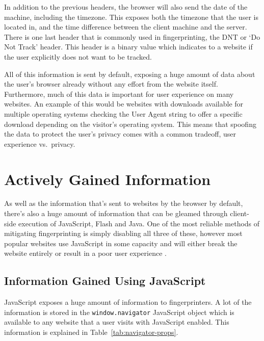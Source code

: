 In addition to the previous headers, the browser will also send the date of the machine, including the timezone.
This exposes both the timezone that the user is located in, and the time difference between the client machine and the server.
There is one last header that is commonly used in fingerprinting, the DNT or `Do Not Track' header.
This header is a binary value which indicates to a website if the user explicitly does not want to be tracked.

All of this information is sent by default, exposing a huge amount of data about the user's browser already without any effort from the website itself.
Furthermore, much of this data is important for user experience on many websites.
An example of this would be websites with downloads available for multiple operating systems checking the User Agent string to offer a specific download depending on the visitor's operating system.
This means that spoofing the data to protect the user's privacy comes with a common tradeoff, user experience vs.\ privacy.

\section{Actively Gained Information}

As well as the information that's sent to websites by the browser by default, there's also a huge amount of information that can be gleamed through client-side execution of JavaScript, Flash and Java.
One of the most reliable methods of mitigating fingerprinting is simply disabling all three of these, however most popular websites use JavaScript in some capacity and will either break the website entirely or result in a poor user experience \citep{disable-js}.

\subsection{Information Gained Using JavaScript}

JavaScript exposes a huge amount of information to fingerprinters.
A lot of the information is stored in the \texttt{window.navigator} JavaScript object which is available to any website that a user visits with JavaScript enabled.
This information is explained in Table~\ref{tab:navigator-props}.

